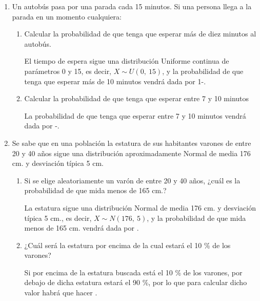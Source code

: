 \begin{enumerate}[leftmargin=*]
\item Un autobús pasa por una parada cada 15 minutos. Si una persona llega a la parada en un momento cualquiera:

\begin{enumerate}

\item Calcular la probabilidad de que tenga que esperar más de diez minutos al autobús.

\begin{indicacion}
El tiempo de espera sigue una distribución Uniforme continua de parámetros 0 y 15, es decir, $X\sim U(0,\ 15)$, y la probabilidad de que tenga que esperar más de 10 minutos vendrá dada por 
1-.
\end{indicacion}

\item Calcular la probabilidad de que tenga que esperar entre 7 y 10 minutos
\begin{indicacion}
La probabilidad de que tenga que esperar entre 7 y 10 minutos vendrá dada por 
-.
\end{indicacion}

\end{enumerate}

\item Se sabe que en una población la estatura de sus habitantes varones de entre 20 y 40 años sigue una distribución aproximadamente Normal de media 176 cm. y desviación típica 5 cm. 

\begin{enumerate}

\item Si se elige aleatoriamente un varón de entre 20 y 40 años, ¿cuál es la probabilidad de que mida menos de 165 cm.?

\begin{indicacion}
La estatura sigue una distribución Normal de media 176 cm. y desviación típica 5 cm., es decir, $X\sim N(176,\ 5)$, y la probabilidad de que mida menos de 165 cm. vendrá dada por .
\end{indicacion}

\item ¿Cuál será la estatura por encima de la cual estará el 10 \% de los varones? 
\begin{indicacion}
Si por encima de la estatura buscada está el 10 \% de los varones, por debajo de dicha estatura estará el 90 \%, por lo que para calcular dicho valor habrá que hacer .
\end{indicacion}
\end{enumerate}

\end{enumerate}


